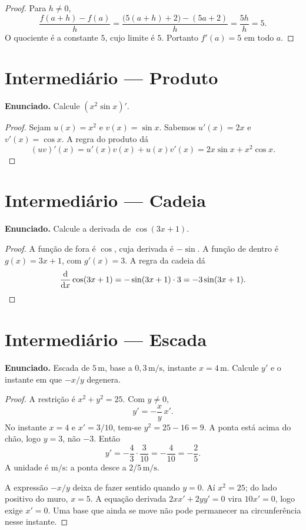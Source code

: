 \documentclass[11pt,a4paper]{article}
\begin{document}
\begin{proof}
Para $h\neq 0$,
\[
\frac{f(a+h)-f(a)}{h}
=\frac{\bigl(5(a+h)+2\bigr)-(5a+2)}{h}
=\frac{5h}{h}=5.
\]
O quociente \'e a constante $5$, cujo limite \'e $5$. Portanto $f'(a)=5$ em todo $a$.
\end{proof}

\section{Intermedi\'ario --- Produto}

\textbf{Enunciado.} Calcule $(x^2\sin x)'$.

\begin{proof}
Sejam $u(x)=x^2$ e $v(x)=\sin x$. Sabemos $u'(x)=2x$ e $v'(x)=\cos x$. A regra do produto d\'a
\[
(uv)'(x)=u'(x)v(x)+u(x)v'(x)=2x\sin x+x^2\cos x.
\]
\end{proof}

\section{Intermedi\'ario --- Cadeia}

\textbf{Enunciado.} Calcule a derivada de $\cos(3x+1)$.

\begin{proof}
A fun\c{c}\~ao de fora \'e $\cos$, cuja derivada \'e $-\sin$. A fun\c{c}\~ao de dentro \'e $g(x)=3x+1$, com $g'(x)=3$. A regra da cadeia d\'a
\[
\frac{\mathrm{d}}{\mathrm{d} x}\cos(3x+1)=-\sin(3x+1)\cdot 3=-3\sin(3x+1).
\]
\end{proof}

\section{Intermedi\'ario --- Escada}

\textbf{Enunciado.} Escada de $5\,\mathrm{m}$, base a $0{,}3\,\mathrm{m/s}$, instante $x=4\,\mathrm{m}$. Calcule $y'$ e o instante em que $-x/y$ degenera.

\begin{proof}
A restri\c{c}\~ao \'e $x^2+y^2=25$. Com $y\neq 0$,
\[
y'=-\frac{x}{y}\,x'.
\]
No instante $x=4$ e $x'=3/10$, tem-se $y^2=25-16=9$. A ponta est\'a acima do ch\~ao, logo $y=3$, n\~ao $-3$. Ent\~ao
\[
y'=-\frac{4}{3}\cdot\frac{3}{10}=-\frac{4}{10}=-\frac{2}{5}.
\]
A unidade \'e $\mathrm{m/s}$: a ponta desce a $2/5\,\mathrm{m/s}$.

A express\~ao $-x/y$ deixa de fazer sentido quando $y=0$. A\'i $x^2=25$; do lado positivo do muro, $x=5$. A equa\c{c}\~ao derivada $2x x'+2y y'=0$ vira $10 x'=0$, logo exige $x'=0$. Uma base que ainda se move n\~ao pode permanecer na circunfer\^encia nesse instante.
\end{proof}
\end{document}
